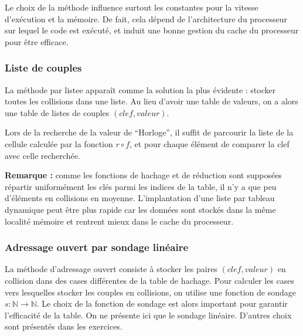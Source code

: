 \documentclass[../../../main.tex]{subfiles}
\begin{document}
Le choix de la méthode influence surtout les constantes pour la vitesse d'exécution et la mémoire. De fait, cela dépend de l'architecture du processeur sur lequel le code est exécuté, et induit une bonne gestion du cache du processeur pour être efficace.
\subsubsection{Liste de couples}
La méthode par listee apparaît comme la solution la plus évidente : stocker toutes les collisions dans une liste. Au lieu d'avoir une table de valeurs, on a alors une table de listes de couples $(clef, valeur)$.

\begin{minipage}{\textwidth}
	\begin{center}
		
	\end{center}
\end{minipage}

Lors de la recherche de la valeur de ``Horloge'', il suffit de parcourir la liste de la cellule calculée par la fonction $r\circ f$, et pour chaque élément de comparer la clef avec celle recherchée.

\textbf{Remarque :} comme les fonctions de hachage et de réduction sont supposées répartir uniformément les clés parmi les indices de la table, il n'y a que peu d'éléments en collisions en moyenne. L'implantation d'une liste par tableau dynamique peut être plus rapide car les données sont stockés dans la même localité mémoire et rentrent mieux dans le cache du processeur.
\subsubsection{Adressage ouvert par sondage linéaire}
La méthode d'adressage ouvert consiste à stocker les paires $(clef, valeur)$ en collision dans des cases différentes de la table de hachage. Pour calculer les cases vers lesquelles stocker les couples en collisions, on utilise une fonction de sondage $s:\mathbb{N}\rightarrow \mathbb{N}$. Le choix de la fonction de sondage est alors important pour garantir l'efficacité de la table. On ne présente ici que le sondage linéaire. D'autres choix sont présentés dans les exercices.

\begin{minipage}{\textwidth}
	\begin{center}
		
	\end{center}
\end{minipage}
\end{document}
